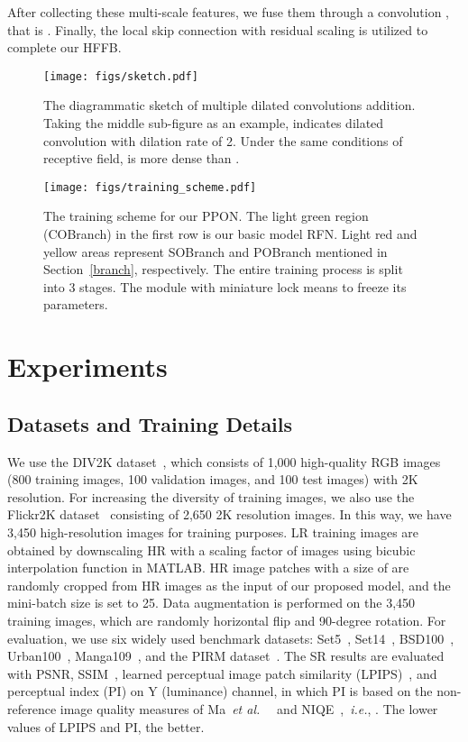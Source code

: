 \documentclass[preprint]{elsarticle}
\newcommand{\etal}{\textit{et al.~}}
\newcommand{\ie}{\textit{i.e.}}
\begin{document}
After collecting these multi-scale features, we fuse them through a  convolution , that is . Finally, the local skip connection with residual scaling is utilized to complete our HFFB.
\begin{figure}[htpb]
	\begin{center}
		\texttt{[image: figs/sketch.pdf]}
	\end{center}
	\caption{The diagrammatic sketch of multiple dilated convolutions addition. Taking the middle sub-figure as an example,  indicates  dilated convolution with dilation rate of 2. Under the same conditions of receptive field,  is more dense than .}
	\label{fig:sketch}
\end{figure}
\begin{figure}[htpb]
	\begin{center}
		\texttt{[image: figs/training\_scheme.pdf]}
	\end{center}
	\caption{The training scheme for our PPON. The light green region (COBranch) in the first row is our basic model RFN. Light red and yellow areas represent SOBranch and POBranch mentioned in Section~\ref{branch}, respectively. The entire training process is split into 3 stages. The module with miniature lock means to freeze its parameters.}
	\label{fig:training-scheme}
\end{figure}
\section{Experiments}\label{sec:experiments}
\subsection{Datasets and Training Details}
We use the DIV2K dataset~\cite{NTIRE2017}, which consists of 1,000 high-quality RGB images (800 training images, 100 validation images, and 100 test images) with 2K resolution. For increasing the diversity of training images, we also use the Flickr2K dataset~\cite{EDSR} consisting of 2,650 2K resolution images. In this way, we have 3,450 high-resolution images for training purposes. LR training images are obtained by downscaling HR with a scaling factor of  images using bicubic interpolation function in MATLAB. HR image patches with a size of  are randomly cropped from HR images as the input of our proposed model, and the mini-batch size is set to 25. Data augmentation is performed on the 3,450 training images, which are randomly horizontal flip and 90-degree rotation. For evaluation, we use six widely used benchmark datasets: Set5~\cite{Set5}, Set14~\cite{Set14}, BSD100~\cite{BSD100}, Urban100~\cite{Urban100}, Manga109~\cite{Manga109}, and the PIRM dataset~\cite{PIRM-SR}. The SR results are evaluated with PSNR, SSIM~\cite{SSIM}, learned perceptual image patch similarity (LPIPS)~\cite{LPIPS}, and perceptual index (PI) on Y (luminance) channel, in which PI is based on the non-reference image quality measures of Ma~\etal~\cite{Ma_Score} and NIQE~\cite{NIQE},~\ie, . The lower values of LPIPS and PI, the better.
\end{document}
